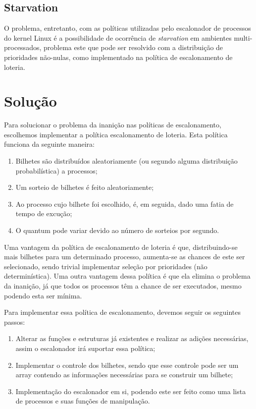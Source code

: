 \documentclass[a4paper,12pt]{article}
\begin{document}
\subsection{Starvation}
O problema, entretanto, com as políticas utilizadas pelo escalonador de processos do kernel Linux é a possibilidade de ocorrência de \emph{starvation} em ambientes multi-processados, problema este que pode ser resolvido com a distribuição de prioridades não-nulas, como implementado na política de escalonamento de loteria\cite{LSWikipedia2015}.

\section{Solução}
Para solucionar o problema da inanição nas políticas de escalonamento, escolhemos implementar a política escalonamento de loteria. Esta política funciona da seguinte maneira:

\begin{enumerate}
  \item Bilhetes são distribuídos aleatoriamente (ou segundo alguma distribuição probabilística) a processos;
  \item Um sorteio de bilhetes é feito aleatoriamente;
  \item Ao processo cujo bilhete foi escolhido, é, em seguida, dado uma fatia de tempo de excução;
  \item O quantum pode variar devido ao número de sorteios por segundo.
\end{enumerate}

Uma vantagem da política de escalonamento de loteria é que, distribuindo-se mais bilhetes para um determinado processo, aumenta-se as chances de este ser selecionado, sendo trivial implementar seleção por prioridades (não determinística). Uma outra vantagem dessa política é que ela elimina o problema da inanição, já que todos os processos têm a chance de ser executados, mesmo podendo esta ser mínima.

Para implementar essa política de escalonamento, devemos seguir os seguintes passos:

\begin{enumerate}
  \item Alterar as funções e estruturas já existentes e realizar as adições necessárias, assim o escalonador irá suportar essa política;
  \item Implementar o controle dos bilhetes, sendo que esse controle pode ser um array contendo as informações necessárias para se construir um bilhete;
  \item Implementação do escalonador em si, podendo este ser feito como uma lista de processos e suas funções de manipulação.
\end{enumerate}
\end{document}
